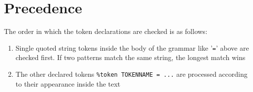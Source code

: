 \section{Precedence}
\label{section:precedence}
The order in which the token declarations are checked is as follows:
\begin{enumerate}
\item Single quoted string tokens inside the body of the grammar like '\verb|=|' above are checked first. 
If two patterns match the same string, the longest match wins
\item The other declared tokens \verb|%token TOKENNAME = ...| are processed according to their appearance 
inside the text 
\end{enumerate}


